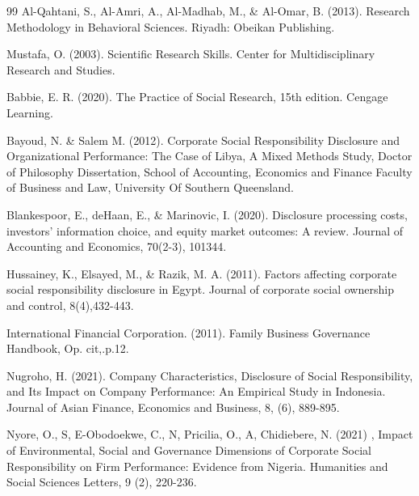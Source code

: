 \documentclass[10pt]{NSP1}
\begin{document}
\begin{thebibliography}{99}
Al-Qahtani, S., Al-Amri, A., Al-Madhab, M., \& Al-Omar, B. (2013). Research Methodology in Behavioral Sciences. Riyadh: Obeikan Publishing.

Mustafa, O. (2003). Scientific Research Skills. Center for Multidisciplinary Research and Studies.

Babbie, E. R. (2020). The Practice of Social Research, 15th edition. Cengage Learning.

Bayoud, N. \& Salem M. (2012). Corporate Social Responsibility Disclosure and Organizational Performance: The Case of Libya, A Mixed Methods Study, Doctor of Philosophy Dissertation, School of Accounting, Economics and Finance Faculty of Business and Law, University Of Southern Queensland.

Blankespoor, E., deHaan, E., \& Marinovic, I. (2020). Disclosure processing costs, investors’ information choice, and equity market outcomes: A review. Journal of Accounting and Economics, 70(2-3), 101344.

Hussainey, K., Elsayed, M., \& Razik, M. A. (2011). Factors affecting corporate social responsibility disclosure in Egypt. Journal of corporate social ownership and control, 8(4),432-443.

International Financial Corporation. (2011). Family Business Governance Handbook, Op. cit,.p.12.

Nugroho, H. (2021). Company Characteristics, Disclosure of Social Responsibility, and Its Impact on Company Performance: An Empirical Study in Indonesia. Journal of Asian Finance, Economics and Business, 8, (6), 889-895.

Nyore, O., S, E-Obodoekwe, C., N, Pricilia, O., A, Chidiebere, N. (2021) , Impact of Environmental, Social and Governance Dimensions of Corporate Social Responsibility on Firm Performance: Evidence from Nigeria. Humanities and Social Sciences Letters, 9 (2), 220-236.

\end{thebibliography}
\end{document}
